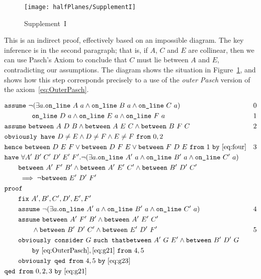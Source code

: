 \begin{figure}
  \centering\texttt{[image: halfPlanes/SupplementI]}
  \caption{Supplement~I}
  \label{fig:SupplementI}
\end{figure}

This is an indirect proof, effectively based on an impossible diagram. The key inference is in the second paragraph; that is, if $A$, $C$ and $E$ are collinear, then we can use Pasch's Axiom to conclude that $C$ must lie between $A$ and $E$, contradicting our assumptions. The diagram shows the situation in Figure~\ref{fig:SupplementI}, and shows how this step corresponds precisely to a use of the \emph{outer Pasch} version of the axiom~\eqref{eq:OuterPasch}.

\begin{boxedfigure}
  \begin{align*}
    &\code{assume}\ \Triangle{a}{A}{B}{C} & 0\\
    &\qquad\qquad \code{on\_line}\ D\ a \wedge \code{on\_line}\ E\ a \wedge \code{on\_line}\ F\ a & 1\\
    &\code{assume}\ \between{A}{D}{B} \wedge \between{A}{E}{C} \wedge \between{B}{F}{C} & 2\\
    &\code{obviously have}\ D\neq E \wedge D\neq F \wedge E\neq F\ \code{from}\ 0,2\\
    &\code{hence}\ \between{D}{E}{F}\vee\between{D}{F}{E}\vee\between{F}{D}{E}\ \code{from}\ 1\ \code{by} \ \eqref{eq:four}&3\\
    &\code{have}\ \forall A'\;B'\;C'\;D'\;E'\;F'. \Triangle{a}{A'}{B'}{C'}\\
    &\qquad \between{A'}{F'}{B'} \wedge \between{A'}{E'}{C'} \wedge \between{B'}{D'}{C'}\\
    &\qquad \implies \neg\between{E'}{D'}{F'}\\ 
    &\code{proof}\\
    &\qquad \code{fix}\ A',B',C',D',E',F'\\
    &\qquad \code{assume}\ \Triangle{a}{A'}{B'}{C'} & 4\\
    &\qquad \code{assume}\ \between{A'}{F'}{B'} \wedge \between{A'}{E'}{C'}\\ &\qquad\qquad\wedge\between{B'}{D'}{C'}\wedge\between{E'}{D'}{F'} & 5\\
    &\qquad\code{obviously consider}\ G\ \code{such that}\between{A'}{G}{E'} \wedge \between{B'}{D'}{G}\\
    &\qquad\qquad\code{by}\ \eqref{eq:OuterPasch},\eqref{eq:g21}\ \code{from}\ 4,5\\
    &\qquad\code{obviously qed from}\ 4,5\ \code{by}\ \eqref{eq:g23}\\
    &\code{qed from}\ 0,2,3\ \code{by}\ \eqref{eq:g21}
  \end{align*}
  \caption{Proof for Supplement~I}
  \label{fig:SupplementIProof}
\end{boxedfigure}

